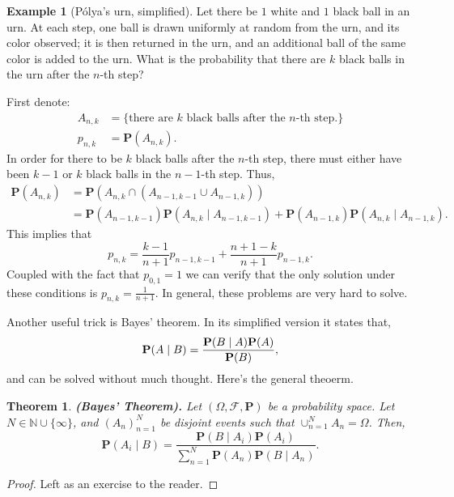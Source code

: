 \documentclass[11pt,a4paper]{article}
\theoremstyle{definition}
\newtheorem{example}{Example}[section]
\theoremstyle{plain}
\newtheorem{theorem}{Theorem}[section]
\newcommand{\N}{\mathbb{N}}
\newcommand{\Prob}{\mathbf{P}}
\renewcommand{\tt}[1]{\textnormal{\textbf{(#1).}}} %
\begin{document}
  \begin{example}[P\'olya's urn, simplified]
     Let there be $1$ white and $1$ black ball in an urn. 
     At each step, one ball is drawn uniformly at random from the urn, 
     and its color observed; 
     it is then returned in the urn, 
     and an additional ball of the same color is added to the urn.
     What is the probability that there are $k$ black balls in the urn after
     the $n$-th step?

     First denote:
     \begin{align*}
       A_{n,k} &= \{\text{there are $k$ black balls after the $n$-th step.}\} \\
       p_{n,k} &= \Prob(A_{n,k}).
     \end{align*}
     In order for there to be $k$ black balls after the $n$-th step, there must
     either have been $k-1$ or $k$ black balls in the $n-1$-th step. Thus,
     \begin{align*}
       \Prob(A_{n,k}) &= 
       \Prob(A_{n,k} \cap (A_{n-1,k-1} \cup A_{n-1,k})) \\ &= 
       \Prob(A_{n-1,k-1}) \Prob(A_{n,k} \mid A_{n-1,k-1}) + 
       \Prob(A_{n-1,k}) \Prob(A_{n,k} \mid A_{n-1,k}).
     \end{align*}
     This implies that
     \[ p_{n,k}=\frac{k-1}{n+1}p_{n-1,k-1}+\frac{n+1-k}{n+1}p_{n-1,k}. \]
     Coupled with the fact that $p_{0,1} = 1$ we can verify that the only
     solution under these conditions is $p_{n,k} = \frac{1}{n+1}$.
     In general, these problems are very hard to solve.
  \end{example}

  Another useful trick is Bayes' theorem.
  In its simplified version it states that,
  \[
    {\bf P}(A \mid B)={\frac{{\bf P}(B \mid A){\bf P}(A)}{{\bf P}(B)}},
  \]
  and can be solved without much thought. Here's the general theoerm.

  \begin{theorem}\tt{Bayes' Theorem}
    Let $(\Omega, \mathcal F, \Prob)$ be a probability space.
    Let $N \in \N \cup \{\infty\}$, and $(A_n)_{n=1}^{N}$ be disjoint events
    such that $\cup_{n=1}^{N} A_n = \Omega$. Then,
    \[
      \Prob(A_i \mid B) = 
      {\frac{\Prob(B \mid A_{i})\Prob(A_{i})}
      {\sum_{n=1}^{N}\Prob(A_{n})\Prob(B \mid A_{n})}}.
    \]
  \end{theorem}
  \begin{proof}
    Left as an exercise to the reader.
  \end{proof}
\end{document}
